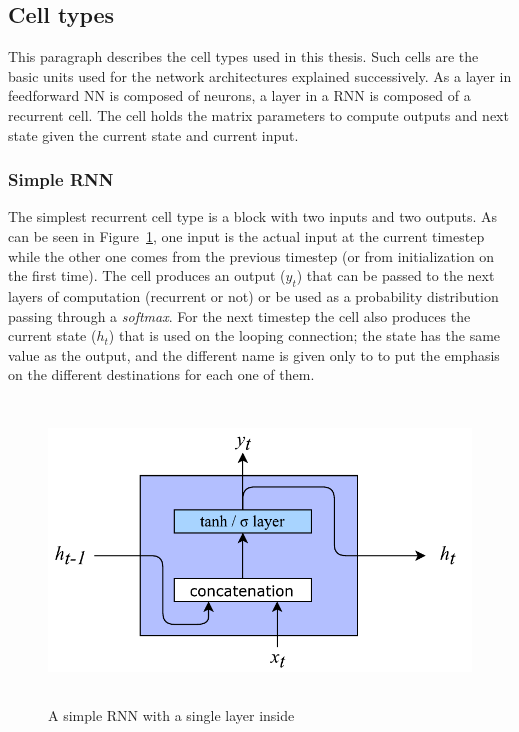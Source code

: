 \subsection{Cell types}
This paragraph describes the  cell types used in this thesis. Such cells are the basic units used for the network architectures explained successively. As a layer in feedforward NN is composed of neurons, a layer in a RNN is composed of a recurrent cell. The cell holds the matrix parameters to compute outputs and next state given the current state and current input.

\subsubsection{Simple RNN}
The simplest recurrent cell type is a block with two inputs and two outputs. As can be seen in Figure~\ref{fig:simpleRNN}, one input is the actual input at the current timestep while the other one comes from the previous timestep (or from initialization on the first time). The cell produces an output ($y_{t}$) that can be passed to the next layers of computation (recurrent or not) or be used as a probability distribution passing through a \textit{softmax}. For the next timestep the cell also produces the current state ($h_{t}$) that is used on the looping connection; the state has the same value as the output, and the different name is given only to to put the emphasis on the different destinations for each one of them.

\begin{figure}[!htb]
    \centering
    \includegraphics[max width=0.9\linewidth,max height=8cm,keepaspectratio]{figures/simpleRNN}
    \caption{A simple RNN with a single layer inside}\label{fig:simpleRNN}
\end{figure}

